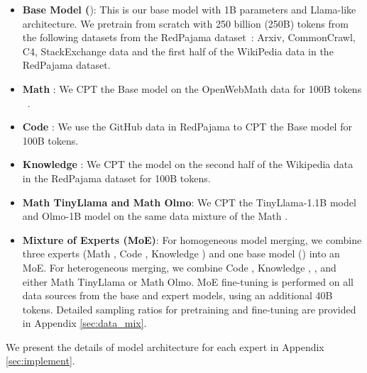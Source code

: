 \begin{itemize}[leftmargin=*]
\item \textbf{Base Model (\llamab}): This is our base model with 1B parameters and Llama-like architecture. We pretrain \llamab from scratch with 250 billion (250B) tokens from the following datasets from the RedPajama dataset~\cite{together2023redpajama}: Arxiv, CommonCrawl, C4, StackExchange data and the first half of the WikiPedia data in the RedPajama dataset. 
    \item \textbf{Math \llama}: We CPT the Base model on the OpenWebMath data for 100B tokens ~\cite{paster2023openwebmath}.
    \item \textbf{Code \llama}: We use the GitHub data in RedPajama to CPT the Base model for 100B tokens.
    \item \textbf{Knowledge \llama}: We CPT the \llamab model on the second half of the Wikipedia data in the RedPajama dataset for 100B tokens.
    \item \textbf{Math TinyLlama and Math Olmo}: We CPT the TinyLlama-1.1B model \cite{zhang2024tinyllama} and Olmo-1B model \cite{groeneveld2024olmo} on the same data mixture of the Math \llama.
    \item \textbf{Mixture of Experts (MoE)}: 
    For homogeneous model merging, we combine three experts (Math \llama, Code \llama, Knowledge \llama) and one base model (\llamab) into an MoE. For heterogeneous merging, we combine Code \llama, Knowledge \llama, \llamab, and either Math TinyLlama or Math Olmo. MoE fine-tuning is performed on all data sources from the base and expert models, using an additional 40B tokens. Detailed sampling ratios for pretraining and fine-tuning are provided in Appendix \ref{sec:data_mix}.
\end{itemize}

We present the details of model architecture for each expert in Appendix \ref{sec:implement}.

